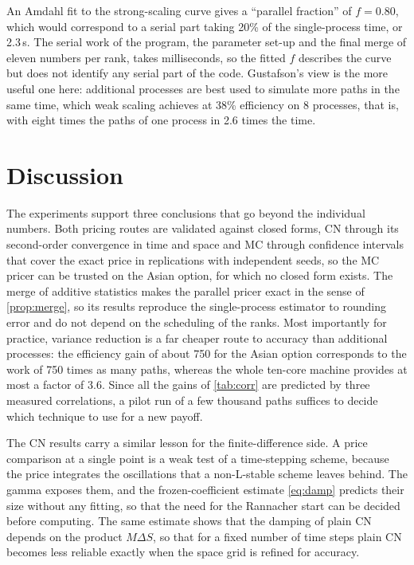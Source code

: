 \documentclass[11pt,a4paper]{article}
\begin{document}
An Amdahl fit to the strong-scaling curve gives a ``parallel fraction'' of $f=0.80$, which would correspond to a serial part taking 20\% of the single-process time, or 2.3\,s.
The serial work of the program, the parameter set-up and the final merge of eleven numbers per rank, takes milliseconds, so the fitted $f$ describes the curve but does not identify any serial part of the code.
Gustafson's view \citep{gustafson1988} is the more useful one here: additional processes are best used to simulate more paths in the same time, which weak scaling achieves at 38\% efficiency on 8 processes, that is, with eight times the paths of one process in 2.6 times the time.

\section{Discussion}\label{sec:discussion}

The experiments support three conclusions that go beyond the individual numbers.
Both pricing routes are validated against closed forms, CN through its second-order convergence in time and space and MC through confidence intervals that cover the exact price in replications with independent seeds, so the MC pricer can be trusted on the Asian option, for which no closed form exists.
The merge of additive statistics makes the parallel pricer exact in the sense of \cref{prop:merge}, so its results reproduce the single-process estimator to rounding error and do not depend on the scheduling of the ranks.
Most importantly for practice, variance reduction is a far cheaper route to accuracy than additional processes: the efficiency gain of about 750 for the Asian option corresponds to the work of 750 times as many paths, whereas the whole ten-core machine provides at most a factor of 3.6.
Since all the gains of \cref{tab:corr} are predicted by three measured correlations, a pilot run of a few thousand paths suffices to decide which technique to use for a new payoff.

The CN results carry a similar lesson for the finite-difference side.
A price comparison at a single point is a weak test of a time-stepping scheme, because the price integrates the oscillations that a non-L-stable scheme leaves behind.
The gamma exposes them, and the frozen-coefficient estimate \cref{eq:damp} predicts their size without any fitting, so that the need for the Rannacher start can be decided before computing.
The same estimate shows that the damping of plain CN depends on the product $M\Delta S$, so that for a fixed number of time steps plain CN becomes less reliable exactly when the space grid is refined for accuracy.
\end{document}
